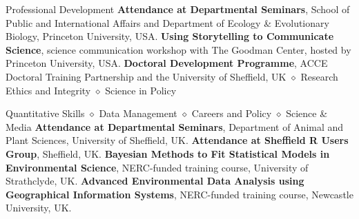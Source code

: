 \begin{rubric}{Professional Development}
\entry*[2019 -- 2021] \textbf{Attendance at Departmental Seminars}, School of Public and International Affairs and Department of Ecology \& Evolutionary Biology, Princeton University, USA.
\entry*[2020] \textbf{Using Storytelling to Communicate Science}, science communication workshop with The Goodman Center, hosted by Princeton University, USA.
\entry*[2014 -- 2018] \textbf{Doctoral Development
Programme}, ACCE Doctoral Training Partnership and the University of Sheffield, UK $\diamond$ Research Ethics and Integrity $\diamond$ Science in Policy \par Quantitative Skills $\diamond$ Data Management $\diamond$ Careers and Policy $\diamond$ Science \& Media
\entry*[2014 -- 2018] \textbf{Attendance at Departmental Seminars}, Department of Animal and Plant Sciences, University of Sheffield, UK.
\entry*[2014 -- 2018] \textbf{Attendance at Sheffield R Users Group}, Sheffield, UK.
\entry*[2016] \textbf{Bayesian Methods to Fit Statistical Models in
Environmental Science}, NERC-funded training course, University of Strathclyde, UK.
\entry*[2015] \textbf{Advanced Environmental Data Analysis using
Geographical Information Systems}, NERC-funded training course, Newcastle University, UK.

\end{rubric}
